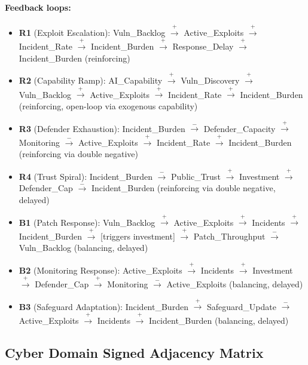 \documentclass[11pt]{article}
\begin{document}
\paragraph{Feedback loops:}
{\footnotesize
\begin{itemize}[leftmargin=2em,itemsep=1pt]
\item \textbf{R1} (Exploit Escalation): Vuln\_Backlog $\xrightarrow{+}$ Active\_Exploits $\xrightarrow{+}$ Incident\_Rate $\xrightarrow{+}$ Incident\_Burden $\xrightarrow{+}$ Response\_Delay $\xrightarrow{+}$ Incident\_Burden (reinforcing)
\item \textbf{R2} (Capability Ramp): AI\_Capability $\xrightarrow{+}$ Vuln\_Discovery $\xrightarrow{+}$ Vuln\_Backlog $\xrightarrow{+}$ Active\_Exploits $\xrightarrow{+}$ Incident\_Rate $\xrightarrow{+}$ Incident\_Burden (reinforcing, open-loop via exogenous capability)
\item \textbf{R3} (Defender Exhaustion): Incident\_Burden $\xrightarrow{-}$ Defender\_Capacity $\xrightarrow{+}$ Monitoring $\xrightarrow{-}$ Active\_Exploits $\xrightarrow{+}$ Incident\_Rate $\xrightarrow{+}$ Incident\_Burden (reinforcing via double negative)
\item \textbf{R4} (Trust Spiral): Incident\_Burden $\xrightarrow{-}$ Public\_Trust $\xrightarrow{+}$ Investment $\xrightarrow{+}$ Defender\_Cap $\xrightarrow{-}$ Incident\_Burden (reinforcing via double negative, delayed)
\item \textbf{B1} (Patch Response): Vuln\_Backlog $\xrightarrow{+}$ Active\_Exploits $\xrightarrow{+}$ Incidents $\xrightarrow{+}$ Incident\_Burden $\xrightarrow{+}$ [triggers investment] $\xrightarrow{+}$ Patch\_Throughput $\xrightarrow{-}$ Vuln\_Backlog (balancing, delayed)
\item \textbf{B2} (Monitoring Response): Active\_Exploits $\xrightarrow{+}$ Incidents $\xrightarrow{+}$ Investment $\xrightarrow{+}$ Defender\_Cap $\xrightarrow{+}$ Monitoring $\xrightarrow{-}$ Active\_Exploits (balancing, delayed)
\item \textbf{B3} (Safeguard Adaptation): Incident\_Burden $\xrightarrow{+}$ Safeguard\_Update $\xrightarrow{-}$ Active\_Exploits $\xrightarrow{+}$ Incidents $\xrightarrow{+}$ Incident\_Burden (balancing, delayed)
\end{itemize}
}

\subsection{Cyber Domain Signed Adjacency Matrix}
\label{app:cyber_matrix}
\end{document}
